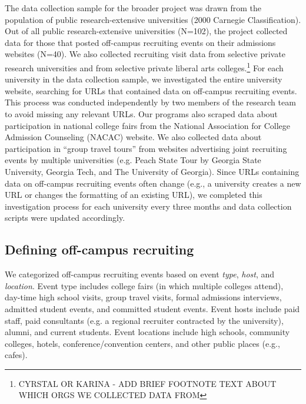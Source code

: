 \documentclass[twoside]{article}
\begin{document}
The data collection sample for the broader project was drawn from the population of public research-extensive universities (2000 Carnegie Classification). Out of all public research-extensive universities (N=102), the project collected data for those that posted off-campus recruiting events on their admissions websites (N=40). We also collected recruiting visit data from selective private research  universities and from selective private liberal arts colleges.\footnote{CYRSTAL OR KARINA - ADD BRIEF FOOTNOTE TEXT ABOUT WHICH ORGS WE COLLECTED DATA FROM} For each university in the data collection sample, we investigated the entire university website, searching for URLs that contained data on off-campus recruiting events. This process was conducted independently by two members of the research team to avoid missing any relevant URLs. Our programs also scraped data about participation in national college fairs from the National Association for College Admission Counseling (NACAC) website. We also collected data about participation in ``group travel tours'' from websites advertising joint recruiting events by multiple universities (e.g. Peach State Tour by Georgia State University, Georgia Tech, and The University of Georgia). Since URLs containing data on off-campus recruiting events often change (e.g., a university creates a new URL or changes the formatting of an existing URL),  we completed this investigation process for each university every three months and data collection scripts were updated accordingly.

\subsection*{Defining off-campus recruiting}

We categorized off-campus recruiting events based on event \textit{type}, \textit{host}, and \textit{location}. Event type includes college fairs (in which multiple colleges attend), day-time high school visits, group travel visits, formal admissions interviews, admitted student events, and committed student events. Event hosts include paid staff, paid consultants (e.g. a regional recruiter contracted by the university), alumni, and current students. Event locations include high schools, community colleges, hotels, conference/convention centers, and other public places (e.g., cafes).
\end{document}
